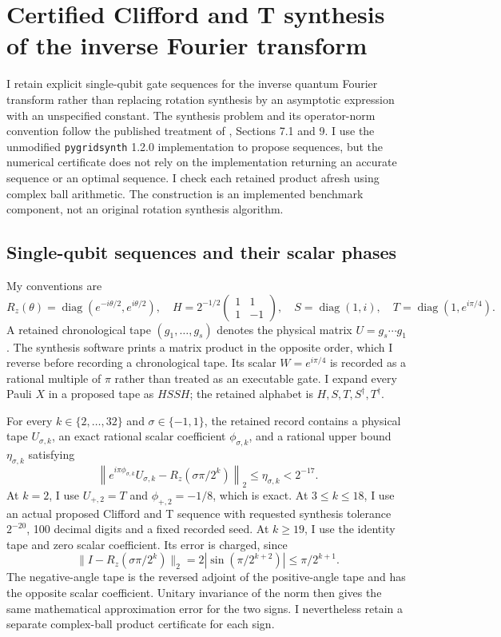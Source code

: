 \section{Certified Clifford and T synthesis of the inverse Fourier transform}
\label{sec:certified-iqft}

I retain explicit single-qubit gate sequences for the inverse quantum Fourier transform rather than replacing rotation synthesis by an asymptotic expression with an unspecified constant. The synthesis problem and its operator-norm convention follow the published treatment of \citet{rossselinger2016}, Sections 7.1 and 9. I use the unmodified \texttt{pygridsynth} 1.2.0 implementation to propose sequences, but the numerical certificate does not rely on the implementation returning an accurate sequence or an optimal sequence. I check each retained product afresh using complex ball arithmetic. The construction is an implemented benchmark component, not an original rotation synthesis algorithm.

\subsection{Single-qubit sequences and their scalar phases}

My conventions are
\[
 R_z(\theta)=\operatorname{diag}(e^{-i\theta/2},e^{i\theta/2}),\quad
 H=2^{-1/2}\begin{pmatrix}1&1\\1&-1\end{pmatrix},\quad
 S=\operatorname{diag}(1,i),\quad
 T=\operatorname{diag}(1,e^{i\pi/4}).
\]
A retained chronological tape $(g_1,\ldots,g_s)$ denotes the physical matrix $U=g_s\cdots g_1$. The synthesis software prints a matrix product in the opposite order, which I reverse before recording a chronological tape. Its scalar $W=e^{i\pi/4}$ is recorded as a rational multiple of $\pi$ rather than treated as an executable gate. I expand every Pauli $X$ in a proposed tape as $HSSH$; the retained alphabet is $H,S,T,S^{\dagger},T^{\dagger}$.

For every $k\in\{2,\ldots,32\}$ and $\sigma\in\{-1,1\}$, the retained record contains a physical tape $U_{\sigma,k}$, an exact rational scalar coefficient $\phi_{\sigma,k}$, and a rational upper bound $\eta_{\sigma,k}$ satisfying
\begin{equation}
 \left\|e^{i\pi\phi_{\sigma,k}}U_{\sigma,k}
        -R_z(\sigma\pi/2^k)\right\|_2
 \leq\eta_{\sigma,k}<2^{-17}.
 \label{eq:retained-rz-cert}
\end{equation}
At $k=2$, I use $U_{+,2}=T$ and $\phi_{+,2}=-1/8$, which is exact. At $3\leq k\leq18$, I use an actual proposed Clifford and T sequence with requested synthesis tolerance $2^{-20}$, 100 decimal digits and a fixed recorded seed. At $k\geq19$, I use the identity tape and zero scalar coefficient. Its error is charged, since
\[
 \|I-R_z(\sigma\pi/2^k)\|_2
   =2\left|\sin(\pi/2^{k+2})\right|
   \leq\pi/2^{k+1}.
\]
The negative-angle tape is the reversed adjoint of the positive-angle tape and has the opposite scalar coefficient. Unitary invariance of the norm then gives the same mathematical approximation error for the two signs. I nevertheless retain a separate complex-ball product certificate for each sign.

